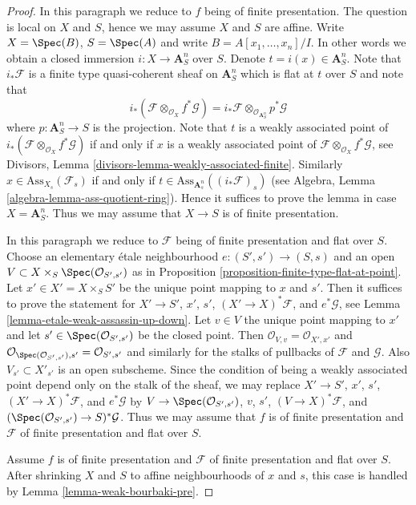 \begin{proof}
In this paragraph we reduce to $f$ being of finite presentation.
The question is local on $X$ and $S$, hence we may assume $X$ and $S$
are affine. Write $X = \Spec(B)$, $S = \Spec(A)$ and write
$B = A[x_1, \ldots, x_n]/I$. In other words we obtain a closed immersion
$i : X \to \mathbf{A}^n_S$ over $S$. Denote $t = i(x) \in \mathbf{A}^n_S$.
Note that $i_*\mathcal{F}$ is a finite type quasi-coherent sheaf on
$\mathbf{A}^n_S$ which is flat at $t$ over $S$ and note that
$$
i_*(\mathcal{F} \otimes_{\mathcal{O}_X} f^*\mathcal{G}) =
i_*\mathcal{F} \otimes_{\mathcal{O}_{\mathbf{A}^n_S}} p^*\mathcal{G}
$$
where $p : \mathbf{A}^n_S \to S$ is the projection. Note that
$t$ is a weakly associated point of
$i_*(\mathcal{F} \otimes_{\mathcal{O}_X} f^*\mathcal{G})$
if and only if $x$ is a weakly associated point of
$\mathcal{F} \otimes_{\mathcal{O}_X} f^*\mathcal{G}$, see
Divisors, Lemma \ref{divisors-lemma-weakly-associated-finite}.
Similarly $x \in \text{Ass}_{X_s}(\mathcal{F}_s)$ if and only
if $t \in \text{Ass}_{\mathbf{A}^n_s}((i_*\mathcal{F})_s)$ (see
Algebra, Lemma \ref{algebra-lemma-ass-quotient-ring}).
Hence it suffices to prove the lemma in case $X = \mathbf{A}^n_S$.
Thus we may assume that $X \to S$ is of finite presentation.

\medskip\noindent
In this paragraph we reduce to $\mathcal{F}$ being of finite presentation
and flat over $S$.
Choose an elementary \'etale neighbourhood $e : (S', s') \to (S, s)$
and an open $V \subset X \times_S \Spec(\mathcal{O}_{S', s'})$
as in Proposition \ref{proposition-finite-type-flat-at-point}.
Let $x' \in X' = X \times_S S'$ be the unique point mapping to $x$
and $s'$. Then it suffices to prove the statement for
$X' \to S'$, $x'$, $s'$, $(X' \to X)^*\mathcal{F}$, and $e^*\mathcal{G}$, see
Lemma \ref{lemma-etale-weak-assassin-up-down}.
Let $v \in V$ the unique point mapping to $x'$
and let $s' \in \Spec(\mathcal{O}_{S', s'})$ be the closed point.
Then $\mathcal{O}_{V, v} = \mathcal{O}_{X', x'}$
and $\mathcal{O}_{\Spec(\mathcal{O}_{S', s'}), s'} =
\mathcal{O}_{S', s'}$ and similarly for the stalks of pullbacks of
$\mathcal{F}$ and $\mathcal{G}$.
Also $V_{s'} \subset X'_{s'}$ is an open subscheme.
Since the condition of being a weakly associated point
depend only on the stalk of the sheaf, we may
replace
$X' \to S'$, $x'$, $s'$, $(X' \to X)^*\mathcal{F}$, and $e^*\mathcal{G}$
by
$V \to \Spec(\mathcal{O}_{S', s'})$, $v$, $s'$, $(V \to X)^*\mathcal{F}$,
and $(\Spec(\mathcal{O}_{S', s'}) \to S)^*\mathcal{G}$.
Thus we may assume that $f$ is of finite presentation and
$\mathcal{F}$ of finite presentation and flat over $S$.

\medskip\noindent
Assume $f$ is of finite presentation and
$\mathcal{F}$ of finite presentation and flat over $S$.
After shrinking $X$ and $S$ to affine neighbourhoods
of $x$ and $s$, this case is handled by
Lemma \ref{lemma-weak-bourbaki-pre}.
\end{proof}

